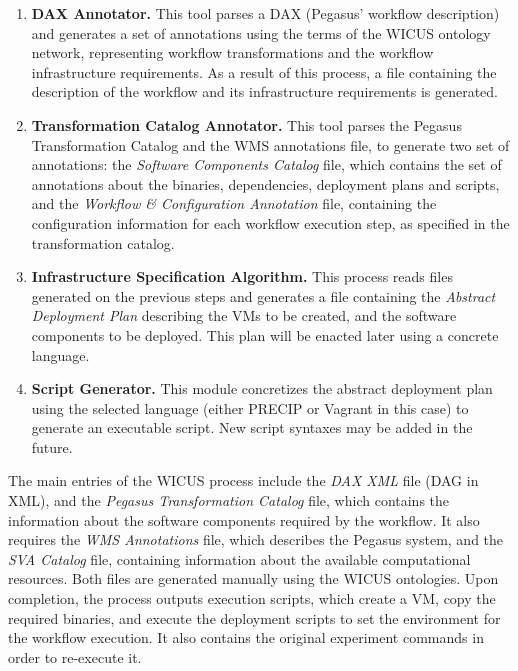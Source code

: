 \begin{enumerate}
	\item \textbf{DAX Annotator.} This tool parses a DAX (Pegasus' workflow description) 
		and generates a set of annotations using the terms of the WICUS ontology network, 
		representing workflow transformations and the workflow infrastructure requirements.
		As a result of this process, a file containing the description of the workflow and 
		its infrastructure requirements is generated.

	\item \textbf{Transformation Catalog Annotator.} This tool parses the Pegasus Transformation 
		Catalog and the WMS annotations file, to generate two set of annotations: the \emph{Software 
		Components Catalog} file, which contains the set of annotations about 
		the binaries, dependencies, deployment plans and scripts, and the \emph{Workflow \& Configuration 
		Annotation} file, containing the configuration information for each workflow execution step, as 
		specified in the transformation catalog.

	\item \textbf{Infrastructure Specification Algorithm.} This process reads files 
		generated on the previous steps and generates a file containing 
		the \emph{Abstract Deployment Plan} describing the VMs to be created,
		and the software components to be deployed. This plan will be enacted 
		later using a concrete language.
		
	\item \textbf{Script Generator.} This module concretizes the abstract deployment 
		plan using the selected language (either PRECIP or Vagrant in this case) to 
		generate an executable script. New script syntaxes may be added in the future.

\end{enumerate}

The main entries of the WICUS process include the \emph{DAX XML} file
(DAG in XML), and the \emph{Pegasus Transformation Catalog} file, which 
contains the information about the software components required by the workflow.
It also requires the \emph{WMS Annotations} file, which describes the Pegasus 
system, and the \emph{SVA Catalog} file, containing information about the
available computational resources. Both files are generated manually using 
the WICUS ontologies. Upon completion, the process outputs execution scripts,
which create a VM, copy the required 
binaries, and execute the deployment scripts to set the environment for the 
workflow execution. It also contains the original experiment commands in order 
to re-execute it.

